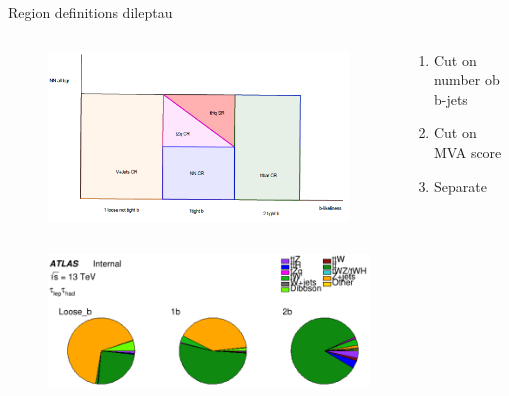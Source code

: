 \begin{frame}{Region definitions dileptau}
    \begin{columns}
        \begin{column}{0.6\textwidth}
            \begin{figure}
                \centering
                \includegraphics[width=\textwidth]{region_defs}
            \end{figure}
        \end{column}
        \begin{column}{0.4\textwidth}
            \begin{enumerate}
                \item Cut on number ob b-jets
                \item Cut on MVA score
                \item Separate \tZq
            \end{enumerate}
        \end{column}
    \end{columns}
    \begin{figure}
        \centering
        \includegraphics[width=0.76\textwidth]{lephad_yield}
    \end{figure}
\end{frame}

